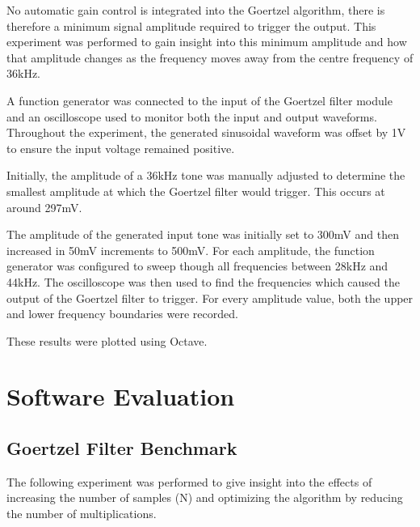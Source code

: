 No automatic gain control is integrated into the Goertzel algorithm, there is therefore a minimum signal amplitude required to trigger the output. This experiment was performed to gain insight into this minimum amplitude and how that amplitude changes as the frequency moves away from the centre frequency of 36kHz.

A function generator was connected to the input of the Goertzel filter module and an oscilloscope used to monitor both the input and output waveforms. Throughout the experiment, the generated sinusoidal waveform was offset by 1V to ensure the input voltage remained positive.

Initially, the amplitude of a 36kHz tone was manually adjusted to determine the smallest amplitude at which the Goertzel filter would trigger. This occurs at around 297mV.

The amplitude of the generated input tone was initially set to 300mV and then increased in  50mV increments to 500mV. For each amplitude, the function generator was configured to sweep though all frequencies between 28kHz and 44kHz. The oscilloscope was then used to find the frequencies which caused the output of the Goertzel filter to trigger. For every amplitude value, both the upper and lower frequency boundaries were recorded.

These results were plotted using Octave.












\section{Software Evaluation}






\subsection{Goertzel Filter Benchmark}

The following experiment was performed to give insight into the effects of increasing the number of samples (N) and optimizing the algorithm by reducing the number of multiplications.

